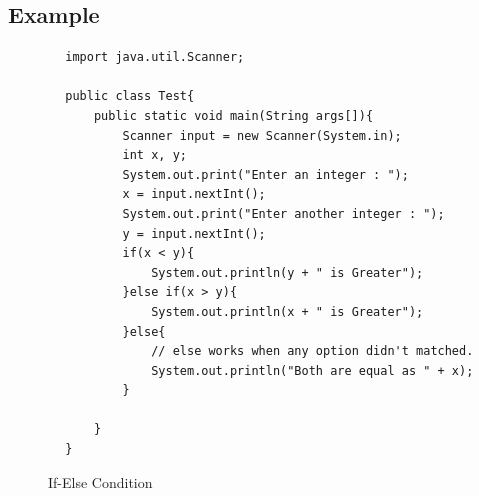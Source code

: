 \documentclass[A4 paper,openany]{book}  %
\begin{document}
\subsection{Example}
\begin{center}
    \begin{verbatim}
        import java.util.Scanner;

        public class Test{
            public static void main(String args[]){
                Scanner input = new Scanner(System.in);
                int x, y;
                System.out.print("Enter an integer : ");
                x = input.nextInt();
                System.out.print("Enter another integer : ");
                y = input.nextInt();
                if(x < y){
                    System.out.println(y + " is Greater");
                }else if(x > y){
                    System.out.println(x + " is Greater");
                }else{
                    // else works when any option didn't matched.
                    System.out.println("Both are equal as " + x);
                }

            }
        }
    \end{verbatim}
\end{center}
% 
% 
\begin{figure}[htbp]
    \begin{center}
        \caption{If-Else Condition}
    \end{center}
\end{figure}
% 
% 
\end{document}
